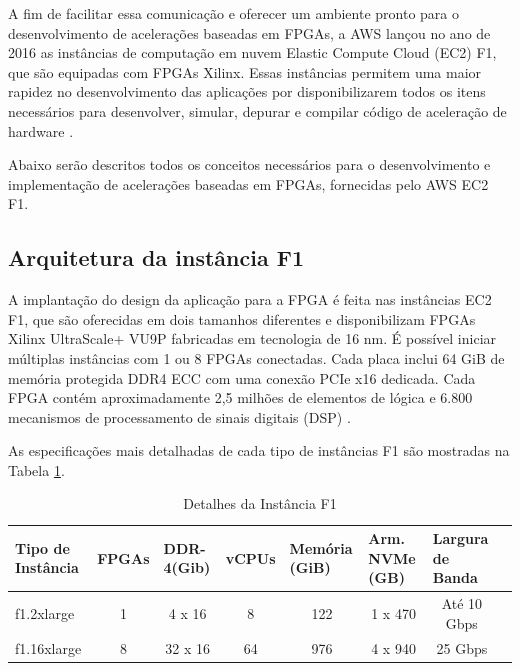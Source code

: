     A fim de facilitar essa comunicação e oferecer um ambiente pronto para o desenvolvimento de acelerações baseadas em FPGAs, a AWS lançou no ano de 2016 as instâncias de computação em nuvem Elastic Compute Cloud (EC2) F1, que são equipadas com FPGAs Xilinx. Essas instâncias permitem uma maior rapidez no desenvolvimento das aplicações por disponibilizarem todos os itens necessários para desenvolver, simular, depurar e compilar código de aceleração de hardware \cite{aws2016f1}.
    
    
    
    Abaixo serão descritos todos os conceitos necessários para o desenvolvimento e implementação de acelerações baseadas em FPGAs, fornecidas pelo AWS EC2 F1.
    
    

  
\subsection{Arquitetura da instância F1} \label{sec:arq}
    
    A implantação do design da aplicação para a FPGA é feita nas instâncias EC2 F1, que são oferecidas em dois tamanhos diferentes e disponibilizam FPGAs Xilinx UltraScale+ VU9P fabricadas em tecnologia de 16 nm. É possível iniciar múltiplas instâncias com 1 ou 8 FPGAs conectadas. Cada placa inclui 64 GiB de memória protegida DDR4 ECC com uma conexão PCIe x16 dedicada.  Cada FPGA contém aproximadamente 2,5 milhões de elementos de lógica e 6.800 mecanismos de processamento de sinais digitais (DSP) \cite{aws2016f1}. %
    
    As especificações mais detalhadas de cada tipo de instâncias F1 são mostradas na Tabela \ref{Tab:F1}. 
        
    \begin{table}[!htb]\tiny
    \centering
     \caption{Detalhes da Instância F1}
    \label{Tab:F1}
    \begin{tabular}{lccccccc}
    \hline
    \multicolumn{1}{l}{Tipo de Instância}&\multicolumn{1}{l}{FPGAs }&\multicolumn{1}{l}{DDR-4(Gib)}&\multicolumn{1}{l}{vCPUs}&\multicolumn{1}{l}{Memória (GiB)}&\multicolumn{1}{l}{Arm. NVMe (GB)}&\multicolumn{1}{l}{Largura de Banda} \\ \midrule 
    
    f1.2xlarge & 1 & 4 x 16 & 8 & 122 & 1 x 470 & Até 10 Gbps\\   \midrule
    f1.16xlarge & 8 & 32 x 16 & 64 & 976 & 4 x 940 & 25  Gbps\\   \midrule

    \end{tabular}
    \end{table}
    


